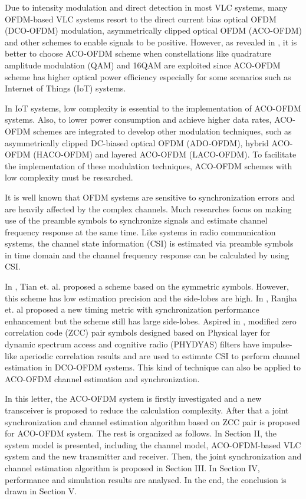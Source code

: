\documentclass[journal]{IEEEtran}
\begin{document}
Due to intensity modulation and direct detection in most VLC systems, many OFDM-based VLC systems resort to the direct current bias optical OFDM (DCO-OFDM) modulation, asymmetrically clipped optical OFDM (ACO-OFDM) and other schemes to enable signals to be positive. However, as revealed in \cite{Dissanayake2013Comparison}, it is better to choose ACO-OFDM scheme when constellations like quadrature amplitude modulation (QAM) and 16QAM are exploited since ACO-OFDM scheme has higher optical power efficiency especially for some scenarios such as Internet of Things (IoT) systems.

In IoT systems, low complexity is essential to the implementation of ACO-OFDM systems. Also, to lower power consumption and achieve higher data rates, ACO-OFDM schemes are integrated to develop other modulation techniques, such as asymmetrically clipped DC-biased optical OFDM (ADO-OFDM), hybrid ACO-OFDM (HACO-OFDM) and layered ACO-OFDM (LACO-OFDM)\cite{Wang2017Optical}. To facilitate the implementation of these modulation techniques, ACO-OFDM schemes with low complexity must be researched.

It is well known that OFDM systems are sensitive to synchronization errors and are heavily affected by the complex channels. Much researches focus on making use of the preamble symbols to synchronize signals and estimate channel frequency response at the same time. Like systems in radio communication systems, the channel state information (CSI) is estimated via preamble symbols in time domain and the channel frequency response can be calculated by using CSI.

In \cite{Tian2008}, Tian et. al. proposed a scheme based on the symmetric symbols. However, this scheme has low estimation precision and the side-lobes are high. In \cite{Ranjha2015}, Ranjha et. al proposed a new timing metric with synchronization performance enhancement but the scheme still has large side-lobes. Aspired in \cite{Qian2017}, modified zero correlation code (ZCC) pair symbols designed based on Physical layer for dynamic spectrum access and cognitive radio (PHYDYAS) \cite{Bellanger2010} filters have impulse-like aperiodic correlation results and are used to estimate CSI to perform channel estimation in DCO-OFDM systems. This kind of technique can also be applied to ACO-OFDM channel estimation and synchronization.

In this letter, the ACO-OFDM system is firstly investigated and a new transceiver is proposed to reduce the calculation complexity. After that a joint synchronization and channel estimation algorithm based on ZCC pair is proposed for ACO-OFDM system.
The rest is organized as follows. In Section II, the system model is presented, including the channel model, ACO-OFDM-based VLC system and the new transmitter and receiver. Then, the joint synchronization and channel estimation algorithm is proposed in Section III. In Section IV, performance and simulation results are analysed. In the end, the conclusion is drawn in Section V.
\end{document}
